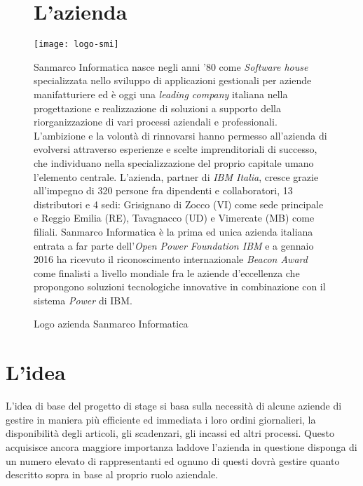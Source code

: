 \begin{figure}[h!]
\section{L'azienda}
   \begin{center}
    \texttt{[image: logo-smi]}
    \caption{Logo azienda Sanmarco Informatica}
    \end{center}
    Sanmarco Informatica nasce negli anni '80 come \textit{Software house} specializzata nello sviluppo di applicazioni gestionali per aziende manifatturiere ed è oggi una \textit{leading company} italiana nella progettazione e realizzazione di soluzioni a supporto della riorganizzazione di vari processi aziendali e professionali. L'ambizione e la volontà di rinnovarsi hanno permesso all'azienda di evolversi attraverso esperienze  e scelte imprenditoriali di successo, che individuano nella specializzazione del proprio capitale umano l'elemento centrale. L'azienda, partner di \textit{IBM Italia}, cresce grazie all'impegno di 320 persone fra dipendenti e collaboratori, 13 distributori e 4 sedi: Grisignano di Zocco (VI) come sede principale e Reggio Emilia (RE), Tavagnacco (UD) e Vimercate (MB) come filiali.
Sanmarco Informatica è la prima ed unica azienda italiana entrata a far parte dell'\textit{Open Power Foundation IBM} e a gennaio 2016 ha ricevuto il riconoscimento internazionale \textit{Beacon Award} come finalisti a livello mondiale fra le aziende d'eccellenza che propongono soluzioni tecnologiche innovative in combinazione con il sistema \textit{Power} di IBM.

    \end{figure}
    







\section{L'idea}



L'idea di base del progetto di stage si basa sulla necessità di alcune aziende di gestire in maniera più efficiente ed immediata i loro ordini giornalieri, la disponibilità degli articoli, gli scadenzari, gli incassi ed altri processi. Questo acquisisce ancora maggiore importanza laddove l'azienda in questione disponga di un numero elevato di rappresentanti ed ognuno di questi dovrà gestire quanto descritto sopra in base al proprio ruolo aziendale. \\ \\

